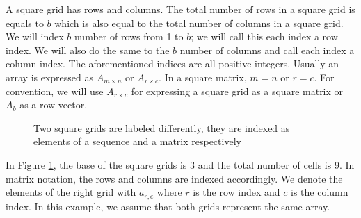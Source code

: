 \documentclass[letterpaper, twoside,12pt]{article}
\begin{document}
    A square grid has rows and columns. The total number of rows in a square grid is equals to $b$ which is also equal to the total number of columns in a square grid. We will index $b$ number of rows from 1 to $b$; we will call this each index a row index. We will also do the same to the $b$ number of columns and call each index a column index. The aforementioned indices are all positive integers. Usually an array is expressed as $A_{m \times n}$ or $A_{r \times c}$. In a square matrix, $m = n$ or $r = c$. For convention, we will use $A_{r \times c}$ for expressing a square grid as a square matrix or $A_{b}$ as a row vector.
    \begin{figure}[ht]
        \centering
        \begin{minipage}{0.45\textwidth}
            \centering
        \end{minipage}
        \begin{minipage}{0.45\textwidth}
            \centering
        \end{minipage}

        \caption{Two square grids are labeled differently, they are indexed as elements of a sequence and a matrix respectively} \label{2forms1grid}
    \end{figure}

    In Figure \ref{2forms1grid}, the base of the square grids is 3 and the total number of cells is 9. In matrix notation, the rows and columns are indexed accordingly. We denote the elements of the right grid with $a_{r,c}$ where $r$ is the row index and $c$ is the column index. In this example, we assume that both grids represent the same array.
\end{document}
